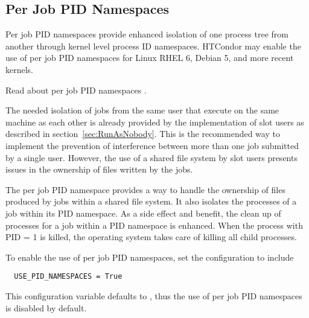 \subsection{\label{sec:PIDNamespaces}Per Job PID Namespaces} 

Per job PID namespaces provide enhanced isolation of one process
tree from another through kernel level process ID namespaces.
HTCondor may enable the use of per job PID namespaces for 
Linux RHEL 6, Debian 5, and more recent kernels.

Read about per job PID namespaces .

The needed isolation of jobs from the same user that execute on the
same machine as each other is already provided by the implementation
of slot users as described in section~\ref{sec:RunAsNobody}.
This is the recommended way to implement the prevention of interference
between more than one job submitted by a single user.
However, the use of a shared file system by slot users presents
issues in the ownership of files written by the jobs.

The per job PID namespace provides a way to handle the ownership
of files produced by jobs within a shared file system.
It also isolates the processes of a job within its PID namespace.
As a side effect and benefit, the clean up of processes for a job
within a PID namespace is enhanced. 
When the process with PID = 1 is killed, 
the operating system takes care of killing all child processes.

To enable the use of per job PID namespaces, 
set the configuration to include

\begin{verbatim}
  USE_PID_NAMESPACES = True
\end{verbatim}

This configuration variable defaults to ,
thus the use of per job PID namespaces is disabled by default.
